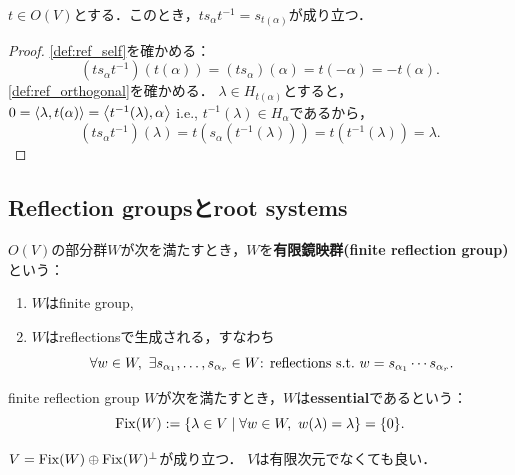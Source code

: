 \begin{lemma} \label{lem:orth_ref_orthinv}
  \label{lem:ref_inner_hold2}
  $t \in O(V)$とする．このとき，$t s_\alpha t^{-1} = s_{t(\alpha)}$が成り立つ．
\end{lemma}

\begin{proof}
  \ref{def:ref_self}を確かめる：
  \begin{equation}
    (t s_\alpha t^{-1})(t(\alpha))
    = (t s_\alpha)(\alpha)
    = t(-\alpha)
    = -t(\alpha).
  \end{equation}
  \ref{def:ref_orthogonal}を確かめる．
  $\lambda \in H_{t(\alpha)}$とすると，$0 = \left\langle \lambda, t(\alpha) \right\rangle = \left\langle t^{-1}(\lambda), \alpha \right\rangle$ i.e., $t^{-1}(\lambda) \in H_\alpha$であるから，
  \begin{equation}
    (t s_\alpha t^{-1})(\lambda)
    = t (s_\alpha(t^{-1}(\lambda)))
    = t(t^{-1}(\lambda))
    = \lambda.
  \end{equation}
\end{proof}

\subsection{Reflection groupsとroot systems}
\begin{definition}
  $O(V)$の部分群$W$が次を満たすとき，$W$を\textbf{有限鏡映群(finite reflection group)}という：
  \begin{enumerate}[label=(\roman*)]
    \item $W$はfinite group,
    \item $W$はreflectionsで生成される，すなわち
    \begin{equation}
      \forall w \in W,\ \exists s_{\alpha_1}, \ldots, s_{\alpha_r} \in W \textrm{: reflections} \ \text{s.t.}\  w = s_{\alpha_1} \cdots s_{\alpha_r}.
    \end{equation}
  \end{enumerate}
\end{definition}

\begin{definition}
  finite reflection group $W$が次を満たすとき，$W$は\textbf{essential}であるという：
  \begin{equation}
    \operatorname{Fix}(W) := \left\lbrace \lambda \in V \mathrel{} \middle| \mathrel{} \forall w \in W,\ w(\lambda) = \lambda \right\rbrace = \{0\}.
  \end{equation}
\end{definition}

\begin{proposition}
  \label{prop:fix_direct_sum}
  $V = \operatorname{Fix}(W) \oplus \operatorname{Fix}(W)^\perp$が成り立つ．
  $V$は有限次元でなくても良い．
\end{proposition}

